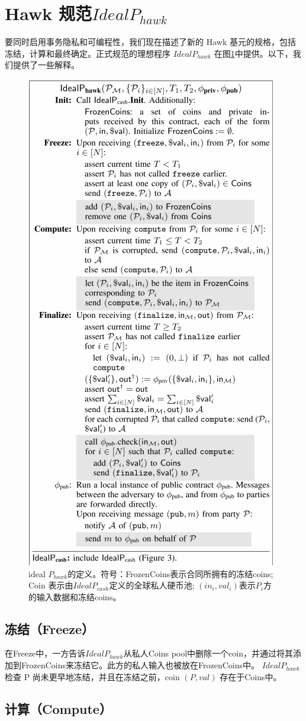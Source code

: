 \documentclass{xduugtrans}
\begin{document}
\section{Hawk 规范$IdealP_{hawk}$}

要同时启用事务隐私和可编程性，我们现在描述了新的 Hawk 基元的规格，包括冻结，计算和最终确定。正式规范的理想程序 $IdealP_{hawk}$ 在图\ref{fig4}中提供。以下，我们提供了一些解释。

\begin{figure}
    \centering
    \includegraphics[width=.5\linewidth]{4}
    \caption{ideal $P_{hawk}$的定义。符号：FrozenCoins表示合同所拥有的冻结coins; Coin 表示由$IdealP_{cash}$定义的全球私人硬币池; $(in_i, val_i)$表示$P_i$方的输入数据和冻结coins。}
    \label{fig4}
\end{figure}

\subsection{冻结（Freeze）}

在Freeze中，一方告诉$IdealP_{hawk}$从私人Coins pool中删除一个coin，并通过将其添加到FrozenCoins来冻结它。此方的私人输入也被放在FrozenCoins中。 $IdealP_{hawk}$ 检查 P 尚未更早地冻结，并且在冻结之前，coin $(P, val)$ 存在于Coins中。

\subsection{计算（Compute）}
\end{document}
